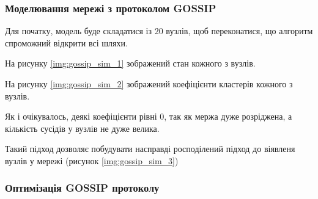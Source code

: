 \documentclass{lib/styles/default-style}
\begin{document}

    \subsubsection{Моделювання мережі з протоколом GOSSIP}

    Для початку, модель буде складатися із 20 вузлів, щоб переконатися, що алгоритм спроможний відкрити всі шляхи.

    На рисунку \ref{img:gossip_sim_1} зображений стан кожного з вузлів.


    На рисунку \ref{img:gossip_sim_2} зображений коефіцієнти кластерів кожного з вузлів.


    Як і очікувалось, деякі коефіцієнти рівні 0, так як мержа дуже розріджена, а кількість сусідів у вузлів 
    не дуже велика.

    Такий підход дозволяє побудувати насправді росподілений підход до віявленя вузлів у мережі (рисунок \ref{img:gossip_sim_3})


    \subsubsection{Оптимізація GOSSIP протоколу}
\end{document}
